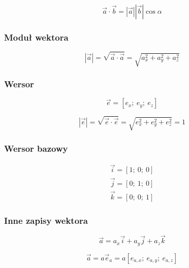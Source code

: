 \begin{equation}
    \Vec{a} \cdot \Vec{b} = |\Vec{a}| |\Vec{b}| \cos\alpha
\end{equation}

\subsubsection*{Moduł wektora}

\begin{equation}
    |\Vec{a}| = \sqrt{\Vec{a} \cdot \Vec{a}} = \sqrt{ a_x^2 + a_y^2 + a_z^2 }
\end{equation}

\subsubsection*{Wersor}

\begin{equation}
    \Vec{e} = [ e_x;\ e_y;\ e_z ]
\end{equation}

\begin{equation}
    |\Vec{e}| = \sqrt{\Vec{e} \cdot \Vec{e}} = \sqrt{ e_x^2 + e_y^2 + e_z^2 } = 1
\end{equation}

\subsubsection*{Wersor bazowy}

\begin{align}
    \Vec{i} = [1;\ 0;\ 0] \nonumber \\
    \Vec{j} = [0;\ 1;\ 0] \nonumber \\
    \Vec{k} = [0;\ 0;\ 1]
\end{align}

\subsubsection*{Inne zapisy wektora}

\begin{equation}
    \Vec{a} = a_x \Vec{i} + a_y \Vec{j} + a_z \Vec{k}
\end{equation}

\begin{equation}
    \Vec{a} = a \Vec{e}_a = a [ e_{a,x};\ e_{a,y};\ e_{a,z} ]
\end{equation}